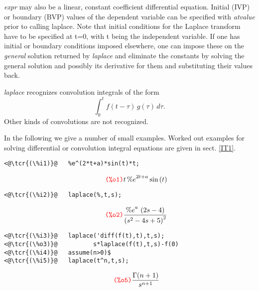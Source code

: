 \documentclass[../Maxima_Workbook.tex]{subfiles}
\begin{document}
\lz \emph{expr} may also be a linear, constant coefficient differential equation. Initial (IVP) or boundary (BVP) values of the dependent variable can be specified with \emph{atvalue} prior to calling laplace. Note that initial conditions for the Laplace transform have to be specified at t=0, with t being the independent variable. If one has initial or boundary conditions imposed elsewhere, one can impose these on the \emph{general} solution returned by \emph{laplace} and eliminate the constants by solving the general solution and possibly its derivative for them and substituting their values back.

\lz \emph{laplace} recognizes convolution integrals of the form
\begin{equation*}
	\int_{0}^{t} f(t-\tau) \, g(\tau) \, d\tau.
\end{equation*}
Other kinds of convolutions are not recognized.

\lz In the following we give a number of small examples.  Worked out examples for solving differential or convolution integral equations are given in sect. \ref{IT1}.

\lz \begin{small}
\color{blue} \leqn
\begin{lstlisting}
<@\tcr{(\%i1)}@   %e^(2*t+a)*sin(t)*t;
\end{lstlisting}
\vspace{-4mm} \[\tag*{\tcr{\ttfamily (\%o1)}} t\, {{\% e}^{2 t+a}} \sin{(t)} \]
\vspace{-9mm} \begin{lstlisting}
<@\tcr{(\%i2)}@   laplace(%,t,s);
\end{lstlisting}
\vspace{-4mm} \[\tag*{\tcr{\ttfamily (\%o2)}} \frac{{{\% e}^{a}}\, \left( 2 s-4\right) }{{{\left( {{s}^{2}}-4 s+5\right) }^{2}}} \]
\vspace{-5mm} \begin{lstlisting}
<@\tcr{(\%i3)}@   laplace('diff(f(t),t),t,s);
<@\tcr{(\%o3)}@		     s*laplace(f(t),t,s)-f(0)
<@\tcr{(\%i4)}@   assume(n>0)$
<@\tcr{(\%i5)}@   laplace(t^n,t,s);
\end{lstlisting}
\vspace{-5mm} \[\tag*{\tcr{\ttfamily (\%o5)}} \frac{\Gamma(n+1)}{s^{n+1}} \]
\color{black} \reqn
\end{small}
\vspace{-2mm} 

\lzz {} \hfill \tcr{[function]}
\end{document}
